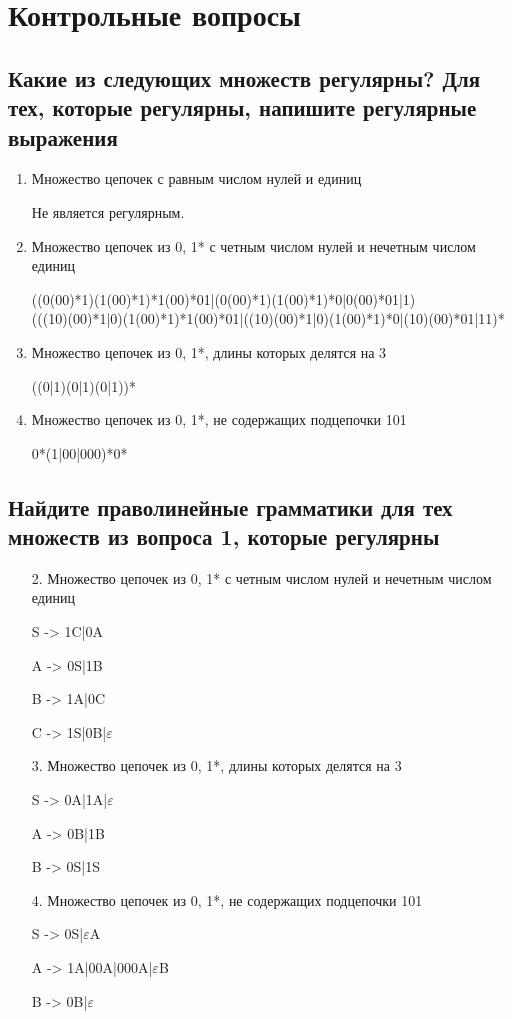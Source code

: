 \section{Контрольные вопросы}

\subsection{Какие из следующих множеств регулярны? Для тех, которые регулярны, напишите регулярные выражения}

\begin{enumerate}
	\item Множество цепочек с равным числом нулей и единиц
	
	Не является регулярным.
	
	\item Множество цепочек из {0, 1}* с четным числом нулей и нечетным числом единиц
	
	((0(00)*1)(1(00)*1)*1(00)*01|(0(00)*1)(1(00)*1)*0|0(00)*01|1)\\
(((10)(00)*1|0)(1(00)*1)*1(00)*01|((10)(00)*1|0)(1(00)*1)*0|(10)(00)*01|11)*

	\item Множество цепочек из {0, 1}*, длины которых делятся на 3
	
	((0|1)(0|1)(0|1))*
	
	\item Множество цепочек из {0, 1}*, не содержащих подцепочки 101
	
	0*(1|00|000)*0*
\end{enumerate}

\subsection{Найдите праволинейные грамматики для тех множеств из вопроса 1, которые регулярны}

\begin{enumerate}
	\item[2.] Множество цепочек из {0, 1}* с четным числом нулей и нечетным числом единиц
	
	S -> 1C|0A 
	
	A -> 0S|1B
	
	B -> 1A|0C
	
	C -> 1S|0B|$\varepsilon$
	
	\item[3.] Множество цепочек из {0, 1}*, длины которых делятся на 3
	
	S -> 0A|1A|$\varepsilon$
	
	A -> 0B|1B
	
	B -> 0S|1S
	
	\item[4.] Множество цепочек из {0, 1}*, не содержащих подцепочки 101
	
	S -> 0S|$\varepsilon$A
	
	A -> 1A|00A|000A|$\varepsilon$B
	
	B -> 0B|$\varepsilon$
	
\end{enumerate}

